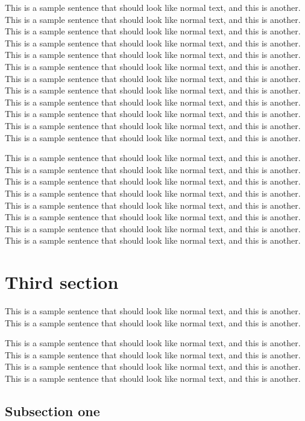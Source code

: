 \documentclass[officiallayout]{tktla}
\begin{document}
This is a sample sentence that should look like normal text, and this
is another. This is a sample sentence that should look like normal
text, and this is another. This is a sample sentence that should look
like normal text, and this is another. This is a sample sentence that
should look like normal text, and this is another. This is a sample
sentence that should look like normal text, and this is another. This
is a sample sentence that should look like normal text, and this is
another. This is a sample sentence that should look like normal text,
and this is another. This is a sample sentence that should look like
normal text, and this is another. This is a sample sentence that
should look like normal text, and this is another. This is a sample
sentence that should look like normal text, and this is another. This
is a sample sentence that should look like normal text, and this is
another. This is a sample sentence that should look like normal text,
and this is another.

This is a sample sentence that should look like normal text, and this
is another. This is a sample sentence that should look like normal
text, and this is another. This is a sample sentence that should look
like normal text, and this is another. This is a sample sentence that
should look like normal text, and this is another. This is a sample
sentence that should look like normal text, and this is another. This
is a sample sentence that should look like normal text, and this is
another. This is a sample sentence that should look like normal text,
and this is another. This is a sample sentence that should look like
normal text, and this is another.

\section{Third section}

This is a sample sentence that should look like normal text, and this
is another. This is a sample sentence that should look like normal
text, and this is another.

This is a sample sentence that should look like normal text, and this
is another. This is a sample sentence that should look like normal
text, and this is another. This is a sample sentence that should look
like normal text, and this is another. This is a sample sentence that
should look like normal text, and this is another.

\subsection{Subsection one}
\end{document}
